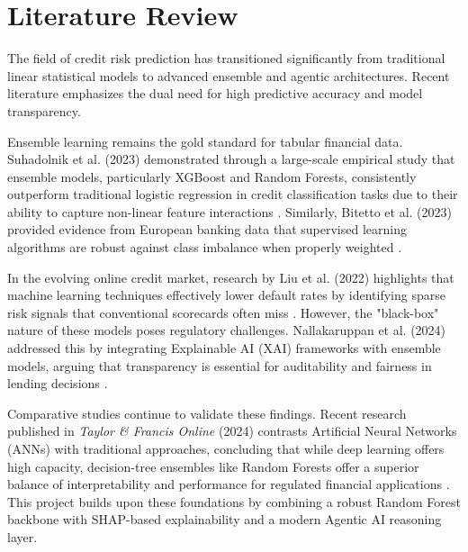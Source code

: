 \documentclass[11pt,a4paper]{article}
\begin{document}
\section{Literature Review}
\label{sec:litreview}

The field of credit risk prediction has transitioned significantly from traditional linear
statistical models to advanced ensemble and agentic architectures. Recent literature 
emphasizes the dual need for high predictive accuracy and model transparency.

Ensemble learning remains the gold standard for tabular financial data. Suhadolnik et al.
(2023) demonstrated through a large-scale empirical study that ensemble models, 
particularly XGBoost and Random Forests, consistently outperform traditional logistic 
regression in credit classification tasks due to their ability to capture non-linear 
feature interactions \cite{suhadolnik2023}. Similarly, Bitetto et al. (2023) provided 
evidence from European banking data that supervised learning algorithms are robust 
against class imbalance when properly weighted \cite{bitetto2023}.

In the evolving online credit market, research by Liu et al. (2022) highlights that 
machine learning techniques effectively lower default rates by identifying sparse risk 
signals that conventional scorecards often miss \cite{liu2022}. However, the 
"black-box" nature of these models poses regulatory challenges. Nallakaruppan et al. 
(2024) addressed this by integrating Explainable AI (XAI) frameworks with ensemble 
models, arguing that transparency is essential for auditability and fairness in lending 
decisions \cite{nallakaruppan2024}. 

Comparative studies continue to validate these findings. Recent research published in 
\textit{Taylor \& Francis Online} (2024) contrasts Artificial Neural Networks (ANNs) 
with traditional approaches, concluding that while deep learning offers high capacity, 
decision-tree ensembles like Random Forests offer a superior balance of interpretability 
and performance for regulated financial applications \cite{tf2024}. This project 
builds upon these foundations by combining a robust Random Forest backbone with 
SHAP-based explainability and a modern Agentic AI reasoning layer.

\end{document}
